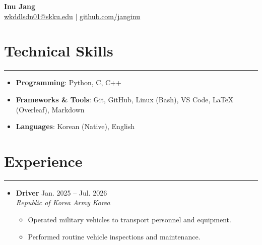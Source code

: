 \documentclass[letterpaper, 10pt]{article}
\begin{document}
\begin{center}
    \textbf{\LARGE Inu Jang} \\ \vspace{2pt}
    \href{mailto:wkddlsdn01@skku.edu}{\underline{wkddlsdn01@skku.edu}} $|$
    \href{https://github.com/janginu}{\underline{github.com/janginu}}
\end{center}

\section*{Technical Skills}
\hrule
\vspace{4pt}
\begin{itemize}
    \item[] \textbf{Programming}: Python, C, C++
    \item[] \textbf{Frameworks \& Tools}: Git, GitHub, Linux (Bash), VS Code, \LaTeX{} (Overleaf), Markdown
    \item[] \textbf{Languages}: Korean (Native), English
\end{itemize}

\section*{Experience}
\hrule
\vspace{4pt}
\begin{itemize}
    \item[]
        \textbf{Driver} \hfill Jan. 2025 -- Jul. 2026 \\
        \textit{Republic of Korea Army} \hfill \textit{Korea}
        \begin{itemize}
            \item Operated military vehicles to transport personnel and equipment.
            \item Performed routine vehicle inspections and maintenance.
        \end{itemize}
\end{itemize}

\end{document}
